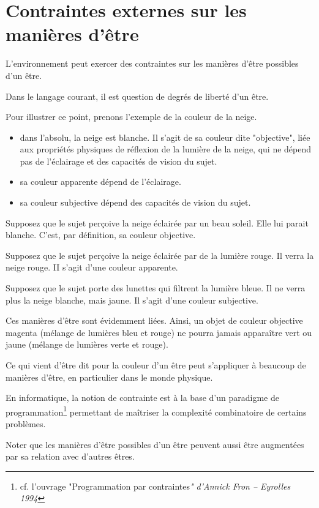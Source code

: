 \documentclass[a4paper, 12pt, openright, french]{book}
\makeatletter
\newcommand{\enableopenany}{%
	\@openrightfalse%
}
\makeatother
\begin{document}
\enableopenany
\raggedbottom
\chapter{Contraintes externes sur les manières d'être}

L'environnement peut exercer des contraintes sur les
manières d'être possibles d'un être.

Dans le langage courant, il est question de degrés de liberté
d'un être.

Pour illustrer ce point, prenons l'exemple de la couleur
de la neige.

\begin{itemize}
\item
  dans l'absolu, la neige est blanche. Il
  s'agit de sa couleur dite "objective", liée aux
  propriétés physiques de réflexion de la lumière de la neige, qui ne
  dépend pas de l'éclairage et des capacités de vision
  du sujet.
\item
  sa couleur apparente dépend de l'éclairage.
\item
  sa couleur subjective dépend des capacités de vision du sujet.
\end{itemize}

Supposez que le sujet perçoive la neige éclairée par un beau soleil.
Elle lui parait blanche. C'est, par définition, sa
couleur objective.

Supposez que le sujet perçoive la neige éclairée par de la lumière
rouge. Il verra la neige rouge. II s'agit
d'une couleur apparente.

Supposez que le sujet porte des lunettes qui filtrent la lumière bleue.
Il ne verra plus la neige blanche, mais jaune. Il s'agit
d'une couleur subjective.

Ces manières d'être sont évidemment liées. Ainsi, un
objet de couleur objective magenta (mélange de lumières bleu et rouge)
ne pourra jamais apparaître vert ou jaune (mélange de lumières verte et
rouge).

Ce qui vient d'être dit pour la couleur
d'un être peut s'appliquer à beaucoup de
manières d'être, en particulier dans le monde physique.

En informatique, la notion de contrainte est à la base
d'un paradigme de programmation\footnote{cf. l'ouvrage
	"Programmation par contraintes\emph{" d'Annick Fron --
		Eyrolles 1994}}
permettant de maîtriser la complexité combinatoire de certains
problèmes.

Noter que les manières d'être possibles
d'un être peuvent aussi être augmentées par sa relation
avec d'autres êtres.
\end{document}
